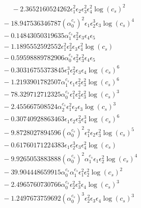 \documentclass[10pt]{article}
\begin{document}
\begin{align*}
\phantom{F_{s,7}} &\phantom{={}}{}  - 2.3652160524262 \epsilon_{1}^{2} \epsilon_{2} \epsilon_{3}^{2} \epsilon_{4}^{2} \log{\left(c_{s} \right)}^{2} \\
&{}  - 18.947536346787 \left(\alpha_{0}^{c_s}\right)^{2} \epsilon_{1} \epsilon_{2}^{3} \epsilon_{3} \log{\left(c_{s} \right)}^{4} \\
&{}  - 0.14843050319635 \alpha_{1}^{c_s} \epsilon_{2}^{2} \epsilon_{3} \epsilon_{4} \epsilon_{5} \\
&{}  - 1.1895552592552 \epsilon_{1}^{2} \epsilon_{2}^{2} \epsilon_{3} \epsilon_{4}^{2} \log{\left(c_{s} \right)} \\
&{}  - 0.59598889782906 \alpha_{0}^{c_s} \epsilon_{2}^{2} \epsilon_{3}^{2} \epsilon_{4} \epsilon_{5} \\
&{}  - 0.30316755373845 \epsilon_{1}^{3} \epsilon_{2}^{2} \epsilon_{3} \epsilon_{4} \log{\left(c_{s} \right)}^{6} \\
&{}  - 1.2193901782507 \alpha_{1}^{c_s} \epsilon_{1} \epsilon_{2}^{2} \epsilon_{3}^{2} \log{\left(c_{s} \right)}^{6} \\
&{}  - 78.329712712325 \alpha_{0}^{c_s} \epsilon_{1}^{2} \epsilon_{2}^{2} \epsilon_{3}^{2} \log{\left(c_{s} \right)}^{3} \\
&{}  - 2.455667508524 \alpha_{2}^{c_s} \epsilon_{1}^{2} \epsilon_{2} \epsilon_{3} \log{\left(c_{s} \right)}^{3} \\
&{}  - 0.30740928863463 \epsilon_{1} \epsilon_{2} \epsilon_{3}^{2} \epsilon_{4}^{3} \log{\left(c_{s} \right)}^{6} \\
&{}  - 9.8728027894596 \left(\alpha_{0}^{c_s}\right)^{2} \epsilon_{1}^{2} \epsilon_{2} \epsilon_{3}^{2} \log{\left(c_{s} \right)}^{5} \\
&{}  - 0.61760171224383 \epsilon_{1} \epsilon_{2}^{3} \epsilon_{3} \epsilon_{4}^{2} \log{\left(c_{s} \right)} \\
&{}  - 9.9265053883888 \left(\alpha_{0}^{c_s}\right)^{2} \alpha_{1}^{c_s} \epsilon_{1} \epsilon_{2}^{2} \log{\left(c_{s} \right)}^{4} \\
&{}  - 39.904448659915 \alpha_{0}^{c_s} \alpha_{1}^{c_s} \epsilon_{1}^{2} \epsilon_{2}^{2} \log{\left(c_{s} \right)}^{2} \\
&{}  - 2.4965760730766 \alpha_{0}^{c_s} \epsilon_{2}^{2} \epsilon_{3}^{3} \epsilon_{4} \log{\left(c_{s} \right)}^{3} \\
&{}  - 1.2497673759692 \left(\alpha_{0}^{c_s}\right)^{3} \epsilon_{2}^{2} \epsilon_{3} \epsilon_{4} \log{\left(c_{s} \right)}^{3} \\

\end{align*}
\end{document}
